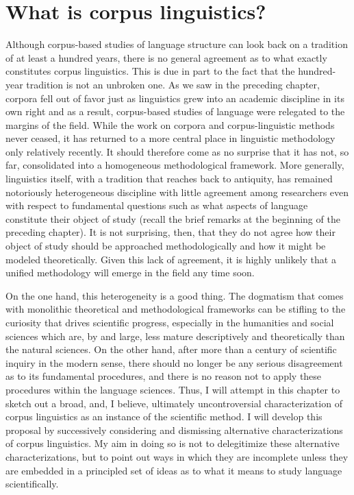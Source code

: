 \chapter{What is corpus linguistics?}\label{ch:corpuslinguistics}\largerpage

Although corpus\hyp{}based studies of language structure can look back on a tradition of at least a hundred years, there is no general agreement as to what exactly constitutes corpus linguistics. This is due in part to the fact that the hundred\hyp{}year tradition is not an unbroken one. As we saw in the preceding chapter, corpora fell out of favor just as linguistics grew into an academic discipline in its own right and as a result, corpus\hyp{}based studies of language were relegated to the margins of the field. While the work on corpora and corpus\hyp{}linguistic methods never ceased, it has returned to a more central place in linguistic methodology only relatively recently. It should therefore come as no surprise that it has not, so far, consolidated into a homogeneous methodological framework. More generally, linguistics itself, with a tradition that reaches back to antiquity, has remained notoriously heterogeneous discipline with little agreement among researchers even with respect to fundamental questions such as what aspects of language constitute their object of study (recall the brief remarks at the beginning of the preceding chapter). It is not surprising, then, that they do not agree how their object of study should be approached methodologically and how it might be modeled theoretically. Given this lack of agreement, it is highly unlikely that a unified methodology will emerge in the field any time soon.

On the one hand, this heterogeneity is a good thing. The dogmatism that comes with monolithic theoretical and methodological frameworks can be stifling to the curiosity that drives scientific progress, especially in the humanities  and social sciences which are, by and large, less mature descriptively  and theoretically than the natural sciences. On the other hand, after more than a century of scientific inquiry in the modern sense, there should no longer be any serious disagreement as to its fundamental procedures, and there is no reason not to apply these procedures within the language sciences. Thus, I will attempt in this chapter to sketch out a broad, and, I believe, ultimately uncontroversial characterization of corpus linguistics as an instance of the scientific method. I will develop this proposal by successively considering and dismissing alternative characterizations of corpus linguistics. My aim in doing so is not to delegitimize these alternative characterizations, but to point out ways in which they are incomplete unless they are embedded in a principled set of ideas as to what it means to study language scientifically.

